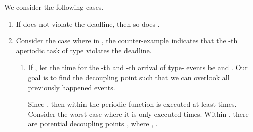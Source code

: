 \documentclass[10pt, a4paper, onecolumn, conference, compsocconf]{IEEEtran}
\begin{document}
\begin{IEEEproof} We consider the following cases.
\begin{enumerate}
    \item If  does not violate the deadline, then so does .
    \item Consider the case where in , the counter-example indicates that the -th aperiodic task of type
           violates the deadline.
    \begin{enumerate}
          \item If , let the time for the -th and -th arrival of type- events be 
          and . Our goal is to find the decoupling point  such that we can overlook
          all previously happened events.

          Since ,
          then within  the periodic function is executed at least 
          times. Consider the worst case where it is only executed
           times. Within , there are  potential decoupling points , where , .


\end{enumerate}
\end{enumerate}
\end{IEEEproof}
\end{document}
